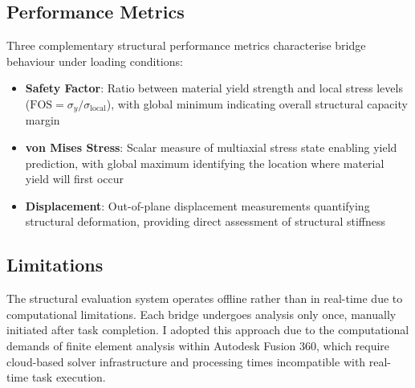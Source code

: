 \subsection{Performance Metrics}

Three complementary structural performance metrics characterise bridge behaviour under loading conditions:

\begin{itemize}
\item \textbf{Safety Factor}: Ratio between material yield strength and local stress levels ($\mathrm{FOS} = \sigma_{y}/\sigma_{\mathrm{local}}$), with global minimum indicating overall structural capacity margin
\item \textbf{von Mises Stress}: Scalar measure of multiaxial stress state enabling yield prediction, with global maximum identifying the location where material yield will first occur
\item \textbf{Displacement}: Out-of-plane displacement measurements quantifying structural deformation, providing direct assessment of structural stiffness
\end{itemize}

\subsection{Limitations}

The structural evaluation system operates offline rather than in real-time due to computational limitations. Each bridge undergoes analysis only once, manually initiated after task completion. I adopted this approach due to the computational demands of finite element analysis within Autodesk Fusion 360, which require cloud-based solver infrastructure and processing times incompatible with real-time task execution.


